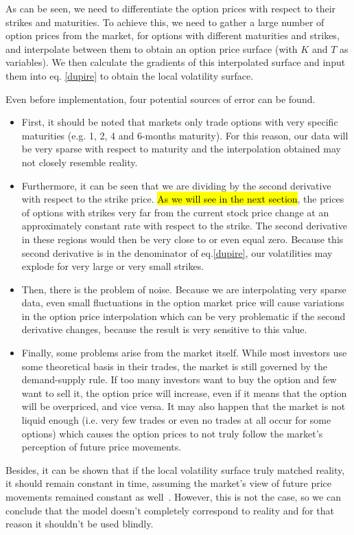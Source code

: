 As can be seen, we need to differentiate the option prices with respect to their strikes and maturities. To achieve this, we need to gather a large number of option prices from the market, for options with different maturities and strikes, and interpolate between them to obtain an option price surface (with $K$ and $T$ as variables). We then calculate the gradients of this interpolated surface and input them into eq. \ref{dupire} to obtain the local volatility surface.

Even before implementation, four potential sources of error can be found.
\begin{itemize}
\item First, it should be noted that markets only trade options with very specific maturities (e.g. 1, 2, 4 and 6-months maturity). For this reason, our data will be very sparse with respect to maturity and the interpolation obtained may not closely resemble reality.
\item Furthermore, it can be seen that we are dividing by the second derivative with respect to the strike price. \hl{As we will see in the next section}, the prices of options with strikes very far from the current stock price change at an approximately constant rate with respect to the strike. The second derivative in these regions would then be very close to or even equal zero. Because this second derivative is in the denominator of eq.\eqref{dupire}, our volatilities may explode for very large or very small strikes.
\item Then, there is the problem of noise. Because we are interpolating very sparse data, even small fluctuations in the option market price will cause variations in the option price interpolation which can be very problematic if the second derivative changes, because the result is very sensitive to this value.
\item Finally, some problems arise from the market itself. While most investors use some theoretical basis in their trades, the market is still governed by the demand-supply rule. If too many investors want to buy the option and few want to sell it, the option price will increase, even if it means that the option will be overpriced, and vice versa. It may also happen that the market is not liquid enough (i.e. very few trades or even no trades at all occur for some options) which causes the option prices to not truly follow the market's perception of future price movements.
\end{itemize}


Besides, it can be shown that if the local volatility surface truly matched reality, it should remain constant in time, assuming the market's view of future price movements remained constant as well~\cite{Wilmott3}. However, this is not the case, so we can conclude that the model doesn't completely correspond to reality and for that reason it shouldn't be used blindly.


